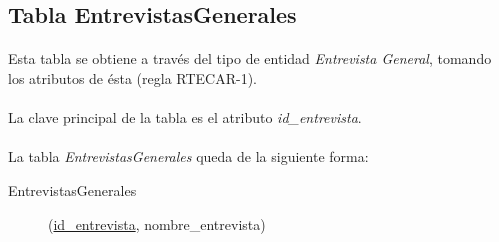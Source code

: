    \subsection{Tabla EntrevistasGenerales}

      \paragraph{}Esta tabla se obtiene a través del tipo de entidad
      \textit{Entrevista General}, tomando los atributos de ésta (regla RTECAR-1).

      \paragraph{}La clave principal de la tabla es el atributo
      \textit{id\_entrevista}.

      \paragraph{}La tabla \textit{EntrevistasGenerales} queda de la siguiente forma:

      \begin{description}
         \item[EntrevistasGenerales] \begin{flushleft}(\underline{id\_entrevista}, nombre\_entrevista)\end{flushleft}
      \end{description}
